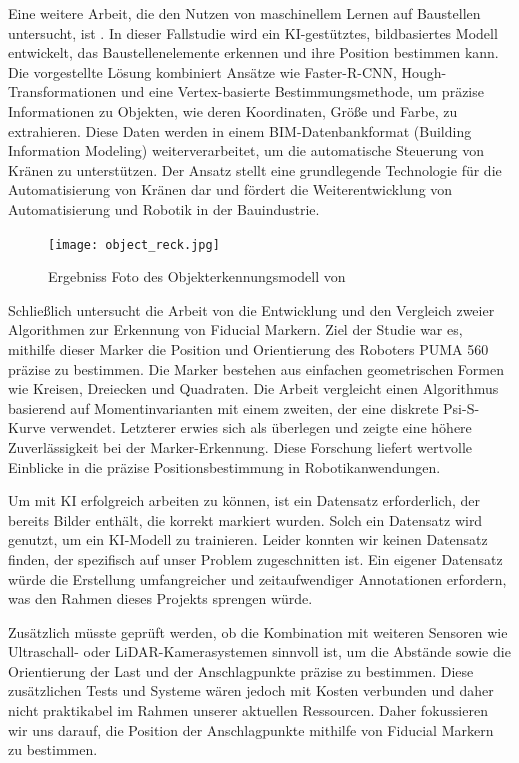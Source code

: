 Eine weitere Arbeit, die den Nutzen von maschinellem Lernen auf Baustellen untersucht, ist \cite{zhou_image-based_2021}. 
In dieser Fallstudie wird ein KI-gestütztes, bildbasiertes Modell entwickelt, das Baustellenelemente erkennen und ihre 
Position bestimmen kann. Die vorgestellte Lösung kombiniert Ansätze wie Faster-R-CNN, Hough-Transformationen und eine Vertex-basierte
Bestimmungsmethode, um präzise Informationen zu Objekten, wie deren Koordinaten, Größe und Farbe, zu extrahieren. Diese Daten werden
in einem BIM-Datenbankformat (Building Information Modeling) weiterverarbeitet, um die automatische Steuerung von Kränen zu unterstützen.
Der Ansatz stellt eine grundlegende Technologie für die Automatisierung von Kränen dar und fördert die Weiterentwicklung von Automatisierung 
und Robotik in der Bauindustrie.

\begin{figure}[H]
    \centering
    \texttt{[image: object\_reck.jpg]}
    \caption{Ergebniss Foto des Objekterkennungsmodell von \cite{yong_object_2023}}
\end{figure}

Schließlich untersucht die Arbeit von \cite{nasaMarkerReport} die Entwicklung und den Vergleich zweier Algorithmen zur Erkennung von 
Fiducial Markern. Ziel der Studie war es, mithilfe dieser Marker die Position und Orientierung des Roboters PUMA 560 präzise zu bestimmen. 
Die Marker bestehen aus einfachen geometrischen Formen wie Kreisen, Dreiecken und Quadraten. Die Arbeit vergleicht einen Algorithmus basierend 
auf Momentinvarianten mit einem zweiten, der eine diskrete Psi-S-Kurve verwendet. Letzterer erwies sich als überlegen und zeigte eine höhere 
Zuverlässigkeit bei der Marker-Erkennung. Diese Forschung liefert wertvolle Einblicke in die präzise Positionsbestimmung in Robotikanwendungen.

Um mit KI erfolgreich arbeiten zu können, ist ein Datensatz erforderlich, der bereits Bilder enthält, die korrekt markiert wurden. Solch ein Datensatz
wird genutzt, um ein KI-Modell zu trainieren. Leider konnten wir keinen Datensatz finden, der spezifisch auf unser Problem zugeschnitten ist. Ein eigener
Datensatz würde die Erstellung umfangreicher und zeitaufwendiger Annotationen erfordern, was den Rahmen dieses Projekts sprengen würde.

Zusätzlich müsste geprüft werden, ob die Kombination mit weiteren Sensoren wie Ultraschall- oder LiDAR-Kamerasystemen sinnvoll ist, um die Abstände sowie 
die Orientierung der Last und der Anschlagpunkte präzise zu bestimmen. Diese zusätzlichen Tests und Systeme wären jedoch mit Kosten verbunden und daher nicht praktikabel 
im Rahmen unserer aktuellen Ressourcen. Daher fokussieren wir uns darauf, die Position der Anschlagpunkte mithilfe von Fiducial Markern zu bestimmen.

